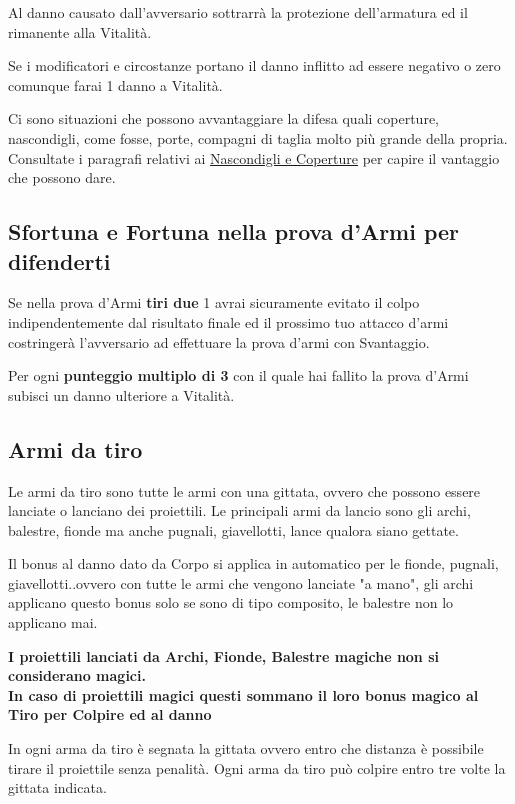 \documentclass[12pt,a4paper,twoside,openany]{book}
\begin{document}
\begin{multicols}{2}
Al danno causato dall'avversario sottrarrà la protezione dell'armatura ed il rimanente alla Vitalità.

Se i modificatori e circostanze portano il danno inflitto ad essere negativo o zero comunque farai 1 danno a Vitalità.

Ci sono situazioni che possono avvantaggiare la difesa quali coperture, nascondigli, come fosse, porte, compagni di taglia molto più grande della propria. Consultate i paragrafi relativi ai \hyperlink{coperture}{Nascondigli e Coperture} per capire il vantaggio che possono dare.

\subsection{Sfortuna e Fortuna nella prova d'Armi per difenderti}

Se nella prova d'Armi \textbf{tiri due} 1 avrai sicuramente evitato il colpo indipendentemente dal risultato finale ed il prossimo tuo attacco d'armi costringerà l'avversario ad effettuare la prova d'armi con Svantaggio.

Per ogni \textbf{punteggio multiplo di 3} con il quale hai fallito la prova d'Armi subisci un danno ulteriore a Vitalità.

\subsection{Armi da tiro}\label{armidatiro}

Le armi da tiro sono tutte le armi con una gittata, ovvero che possono essere lanciate o lanciano dei proiettili. Le principali armi da lancio sono gli archi, balestre, fionde ma anche pugnali, giavellotti, lance qualora siano gettate.

Il bonus al danno dato da Corpo si applica in automatico per le fionde, pugnali, giavellotti..ovvero con tutte le armi che vengono lanciate "a mano", gli archi applicano questo bonus solo se sono di tipo composito, le balestre non lo applicano mai.

\textbf{I proiettili lanciati da Archi, Fionde, Balestre magiche non si considerano magici.\\
In caso di proiettili magici questi sommano il loro bonus magico al Tiro per Colpire ed al danno}

In ogni arma da tiro è segnata la gittata ovvero entro che distanza è possibile tirare il proiettile senza penalità. Ogni arma da tiro può colpire entro tre volte la gittata indicata.


\end{multicols}
\end{document}
